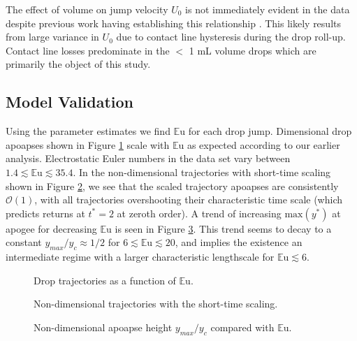 \documentclass[aip,reprint, floatfix]{revtex4-1}
\begin{document}
The effect of volume on jump velocity $U_0$ is not immediately evident in the data despite previous work having establishing this relationship \cite{attari_puddle_2016}. This likely results from large variance in $U_0$ due to contact line hysteresis during the drop roll-up. Contact line losses predominate in the $<$ 1 mL volume drops which are primarily the object of this study.  

\subsection{Model Validation}
Using the parameter estimates we find $\mathbb{E}\mbox{u}$ for each drop jump. Dimensional drop apoapses shown in Figure \ref{fig:series_s_eu} scale with $\mathbb{E}\mbox{u}$ as expected according to our earlier analysis. Electrostatic Euler numbers in the data set vary between $1.4 \lesssim \mathbb{E}\mbox{u} \lesssim 35.4$. In the non-dimensional trajectories with short-time scaling shown in Figure \ref{fig:series_s_ds}, we see that the scaled trajectory apoapses are consistently $\mathcal{O}(1)$, with all trajectories overshooting their characteristic time scale (which predicts returns at $t^*  =2$ at zeroth order). A trend of increasing $\mbox{max} \left(y^* \right)$ at apogee for decreasing $\mathbb{E}\mbox{u}$ is seen in Figure \ref{fig:yscale_trend}. This trend seems to decay to a constant $y_{max}/y_c \approx 1/2$ for $6 \lesssim \mathbb{E}\mbox{u} \lesssim 20$, and implies the existence an intermediate regime with a larger characteristic lengthscale for $\mathbb{E}\mbox{u} \lesssim 6$.
\begin{figure}[!htb]
    \centering
    \resizebox{0.5\textwidth}{!}{}
    \caption{Drop trajectories as a function of $\mathbb{E}\mbox{u}$.\label{fig:series_s_eu}}
\end{figure}
\begin{figure}[htb]
    \centering
    \resizebox{0.5\textwidth}{!}{}
    \caption{Non-dimensional trajectories with the short-time scaling.\label{fig:series_s_ds}}
\end{figure}
\begin{figure}[htb]
    \centering
    \resizebox{0.5\textwidth}{!}{}
    \caption{Non-dimensional apoapse height $y_{max}/y_c$ compared with $\mathbb{E}\mbox{u}$.\label{fig:yscale_trend}}
\end{figure}
\end{document}
